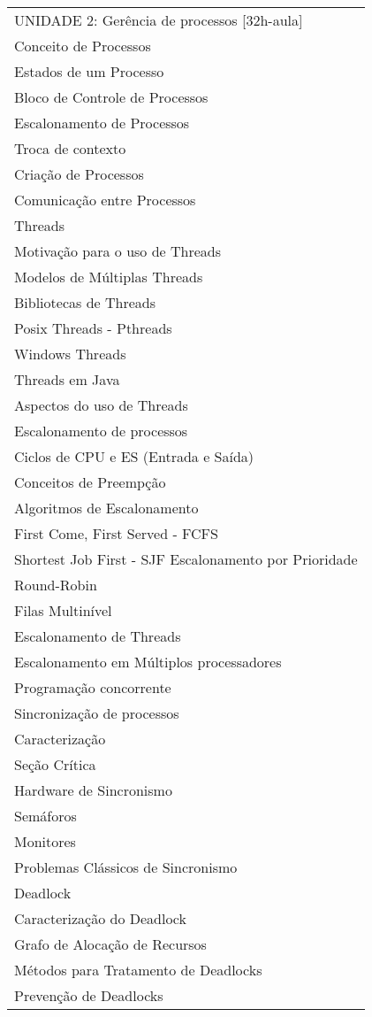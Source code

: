 \documentclass[12pt]{article}
\begin{document}
\begin{longtable}{|L{1.025\textwidth}|}
UNIDADE 2: Gerência de processos [32h-aula]\\
Conceito de Processos\\
Estados de um Processo\\
Bloco de Controle de Processos\\
Escalonamento de Processos\\
Troca de contexto\\
Criação de Processos\\
Comunicação entre Processos\\
Threads\\
Motivação para o uso de Threads\\
Modelos de Múltiplas Threads\\
Bibliotecas de Threads\\
Posix Threads - Pthreads\\
Windows Threads\\
Threads em Java\\
Aspectos do uso de Threads\\
Escalonamento de processos\\
Ciclos de CPU e ES (Entrada e Saída)\\
Conceitos de Preempção\\
Algoritmos de Escalonamento\\
First Come, First Served - FCFS\\
Shortest Job First - SJF
Escalonamento por Prioridade\\
Round-Robin\\
Filas Multinível\\
Escalonamento de Threads\\
Escalonamento em Múltiplos processadores\\
Programação concorrente\\
Sincronização de processos\\
Caracterização\\
Seção Crítica\\
Hardware de Sincronismo\\
Semáforos\\
Monitores\\
Problemas Clássicos de Sincronismo\\
Deadlock\\
Caracterização do Deadlock\\
Grafo de Alocação de Recursos\\
Métodos para Tratamento de Deadlocks\\
Prevenção de Deadlocks\\

\end{longtable}
\end{document}
